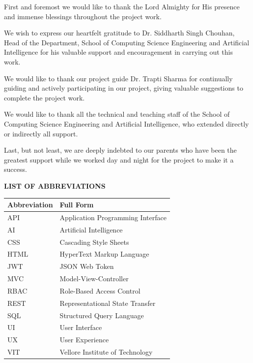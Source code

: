 \vspace{1cm}
\begin{minipage}{0.9\textwidth}
\setlength{\parindent}{0pt}
\setlength{\parskip}{1em}

First and foremost we would like to thank the Lord Almighty for His presence and immense blessings throughout the project work.

We wish to express our heartfelt gratitude to Dr. Siddharth Singh Chouhan, Head of the Department, School of Computing Science Engineering and Artificial Intelligence for his valuable support and encouragement in carrying out this work.

We would like to thank our project guide Dr. Trapti Sharma for continually guiding and actively participating in our project, giving valuable suggestions to complete the project work.

We would like to thank all the technical and teaching staff of the School of Computing Science Engineering and Artificial Intelligence, who extended directly or indirectly all support.

Last, but not least, we are deeply indebted to our parents who have been the greatest support while we worked day and night for the project to make it a success.

\end{minipage}

\newpage
\thispagestyle{empty}
\centering

{\Huge\bfseries\textcolor{titleblue}{LIST OF ABBREVIATIONS}}\par

\vspace{1cm}
\begin{minipage}{0.8\textwidth}
\begin{tabular}{@{}p{}p{}@{}}
\textbf{Abbreviation} & \textbf{Full Form} \\
\hline
API & Application Programming Interface \\
AI & Artificial Intelligence \\
CSS & Cascading Style Sheets \\
HTML & HyperText Markup Language \\
JWT & JSON Web Token \\
MVC & Model-View-Controller \\
RBAC & Role-Based Access Control \\
REST & Representational State Transfer \\
SQL & Structured Query Language \\
UI & User Interface \\
UX & User Experience \\
VIT & Vellore Institute of Technology \\
\end{tabular}
\end{minipage}

